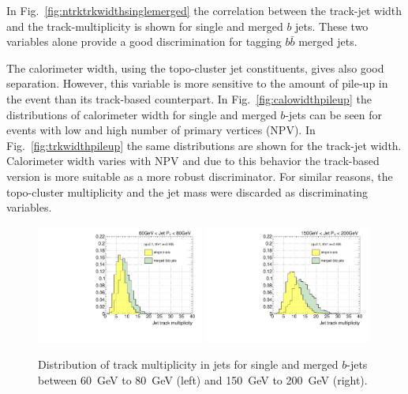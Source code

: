 In Fig.~\ref{fig:ntrktrkwidthsinglemerged} the correlation between the track-jet width and the track-multiplicity is shown for single and merged $b$ jets. These two variables alone provide a good discrimination for tagging $b \bar{b}$ merged jets.


The calorimeter width, using the topo-cluster jet constituents, gives also good separation. However, this variable is more sensitive to the amount of pile-up in the event than its track-based counterpart. In Fig.~\ref{fig:calowidthpileup} the distributions of calorimeter width for single and merged $b$-jets can be seen for events with low and high number of primary vertices (NPV). In Fig.~\ref{fig:trkwidthpileup} the same distributions are shown for the track-jet width. Calorimeter width varies %
with NPV and due to this behavior the track-based version is more suitable as a more robust discriminator. For similar reasons, the topo-cluster multiplicity and the jet mass were discarded as discriminating variables.


\begin{figure}[tp]
\centering
\includegraphics[width=0.49\textwidth]{FIGS/VarsSingleMerged/Ntrk060.pdf}
\includegraphics[width=0.49\textwidth]{FIGS/VarsSingleMerged/Ntrk150.pdf}
\caption{Distribution of track multiplicity in jets for single and merged $b$-jets between 60~GeV to 80~GeV (left) and 150~GeV to 200~GeV (right).}
\label{fig:ntrksinglemerged}
\end{figure}

